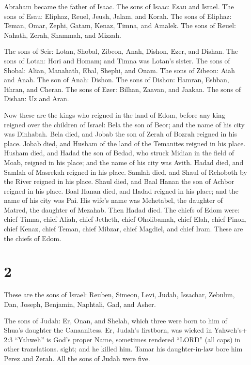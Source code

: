 Abraham became the father of Isaac. The sons of Isaac:
Esau and Israel.  The sons of Esau: Eliphaz, Reuel, Jeush,
Jalam, and Korah.  The sons of Eliphaz: Teman, Omar, Zephi,
Gatam, Kenaz, Timna, and Amalek.  The sons of Reuel:
Nahath, Zerah, Shammah, and Mizzah.

 The sons of Seir: Lotan, Shobal, Zibeon, Anah, Dishon,
Ezer, and Dishan.  The sons of Lotan: Hori and Homam; and
Timna was Lotan's sister.  The sons of Shobal: Alian,
Manahath, Ebal, Shephi, and Onam. The sons of Zibeon: Aiah and Anah.
 The son of Anah: Dishon. The sons of Dishon: Hamran,
Eshban, Ithran, and Cheran.  The sons of Ezer: Bilhan,
Zaavan, and Jaakan. The sons of Dishan: Uz and Aran.

 Now these are the kings who reigned in the land of Edom,
before any king reigned over the children of Israel: Bela the son of
Beor; and the name of his city was Dinhabah.  Bela died,
and Jobab the son of Zerah of Bozrah reigned in his place. 
Jobab died, and Husham of the land of the Temanites reigned in his
place.  Husham died, and Hadad the son of Bedad, who struck
Midian in the field of Moab, reigned in his place; and the name of his
city was Avith.  Hadad died, and Samlah of Masrekah reigned
in his place.  Samlah died, and Shaul of Rehoboth by the
River reigned in his place.  Shaul died, and Baal Hanan the
son of Achbor reigned in his place.  Baal Hanan died, and
Hadad reigned in his place; and the name of his city was Pai. His wife's
name was Mehetabel, the daughter of Matred, the daughter of Mezahab.
 Then Hadad died. The chiefs of Edom were: chief Timna,
chief Aliah, chief Jetheth,  chief Oholibamah, chief Elah,
chief Pinon,  chief Kenaz, chief Teman, chief Mibzar,
 chief Magdiel, and chief Iram. These are the chiefs of
Edom.

\hypertarget{section-1}{%
\section{2}\label{section-1}}

 These are the sons of Israel: Reuben, Simeon, Levi, Judah,
Issachar, Zebulun,  Dan, Joseph, Benjamin, Naphtali, Gad,
and Asher.

 The sons of Judah: Er, Onan, and Shelah, which three were
born to him of Shua's daughter the Canaanitess. Er, Judah's firstborn,
was wicked in Yahweh's+ 2:3 ``Yahweh'' is God's proper Name, sometimes
rendered ``LORD'' (all caps) in other translations. sight; and he killed
him.  Tamar his daughter-in-law bore him Perez and Zerah.
All the sons of Judah were five.

